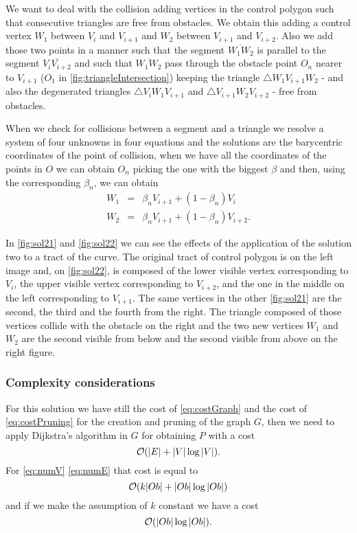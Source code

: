 \documentclass[dissertation.tex]{subfiles}
\begin{document}
We want to deal with the collision adding vertices in the control
polygon such that consecutive triangles are free from obstacles. We
obtain this adding a control vertex $W_1$ between $V_i$ and $V_{i+1}$
and $W_2$ between $V_{i+1}$ and $V_{i+2}$. Also we add those two
points in a manner such that the segment $\overline{W_1W_2}$ is
parallel to the segment $\overline{V_iV_{i+2}}$ and such that
$\overline{W_1W_2}$ pass through the obstacle point $O_n$ nearer to
$V_{i+1}$ ($O_1$ in \cref{fig:triangleIntersection}) keeping the
triangle $\triangle W_1V_{i+1}W_2$ - and also
the degenerated triangles $\triangle V_iW_1V_{i+1}$ and $\triangle
V_{i+1}W_2V_{i+2}$ - free from obstacles.

When we check for collisions between a segment and a triangle we
resolve a system of four unknowns in
four equations and the solutions are the barycentric coordinates of
the point of collision, when we have all the coordinates of the points
in $O$ we can obtain $O_n$ picking the one with the biggest $\beta$
and then, using the corresponding $\beta_n$, we can obtain
\begin{eqnarray*}
  W_1&=&\beta_n V_{i+1}+(1-\beta_n)V_i\\
  W_2&=&\beta_n V_{i+1}+(1-\beta_n)V_{i+2}.
\end{eqnarray*}

In \cref{fig:sol21} and \cref{fig:sol22} we can see the effects of the
application of the
solution two to a tract of the curve. The original tract of control
polygon is on the left image and, on \cref{fig:sol22}, is composed of
the lower
visible vertex corresponding to $V_i$, the
upper visible vertex corresponding to $V_{i+2}$, and the one in
the middle on the left corresponding to $V_{i+1}$. The same vertices
in the other \cref{fig:sol21} are the second, the third and the fourth
from the right. The triangle
composed of those vertices
collide with the obstacle on the right and the two new vertices $W_1$
and $W_2$ are the second visible from below and the second visible
from above on the right figure.

\subsubsection{Complexity considerations}
For this solution we have still the cost of \cref{eq:costGraph} and
the cost of \cref{eq:costPruning} for
the creation and pruning of the graph $G$, then we need to apply Dijkstra's
algorithm in $G$ for obtaining $P$ with a cost
\begin{equation*}
  \mathcal{O}(|E|+|V|\log |V|).
\end{equation*}
For \cref{eq:numV} \cref{eq:numE} that cost is equal to
\begin{equation*}
  \mathcal{O}(k|Ob|+|Ob|\log |Ob|)
\end{equation*}
and if we make the assumption of $k$ constant we have a cost
\begin{equation*}
  \mathcal{O}(|Ob|\log |Ob|).
\end{equation*}
\end{document}
